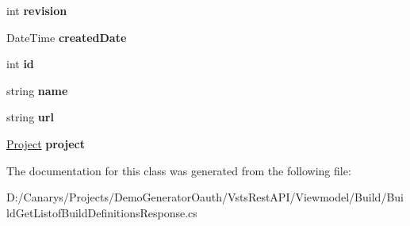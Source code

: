 \begin{DoxyCompactItemize}
\item 
\mbox{\label{class_vsts_rest_a_p_i_1_1_viewmodel_1_1_build_1_1_build_get_listof_build_definitions_response_1_1_value_a2bb81221575164f9c07068a4f5fa725e}} 
int {\bfseries revision}
\item 
\mbox{\label{class_vsts_rest_a_p_i_1_1_viewmodel_1_1_build_1_1_build_get_listof_build_definitions_response_1_1_value_ade5d699e00ff840bc92104bd6272b04a}} 
Date\+Time {\bfseries created\+Date}
\item 
\mbox{\label{class_vsts_rest_a_p_i_1_1_viewmodel_1_1_build_1_1_build_get_listof_build_definitions_response_1_1_value_a3c074fa1d36d7a6c518d6f76ec575355}} 
int {\bfseries id}
\item 
\mbox{\label{class_vsts_rest_a_p_i_1_1_viewmodel_1_1_build_1_1_build_get_listof_build_definitions_response_1_1_value_a62817abe4b71fd36666fe15875e8e064}} 
string {\bfseries name}
\item 
\mbox{\label{class_vsts_rest_a_p_i_1_1_viewmodel_1_1_build_1_1_build_get_listof_build_definitions_response_1_1_value_a112b95a7eae22f6f65cbe99992cfb65c}} 
string {\bfseries url}
\item 
\mbox{\label{class_vsts_rest_a_p_i_1_1_viewmodel_1_1_build_1_1_build_get_listof_build_definitions_response_1_1_value_ab29fc9c7f73e377bf4744ccacc17ca52}} 
\mbox{\hyperlink{class_vsts_rest_a_p_i_1_1_viewmodel_1_1_build_1_1_build_get_listof_build_definitions_response_1_1_project}{Project}} {\bfseries project}
\end{DoxyCompactItemize}


The documentation for this class was generated from the following file\+:\begin{DoxyCompactItemize}
\item 
D\+:/\+Canarys/\+Projects/\+Demo\+Generator\+Oauth/\+Vsts\+Rest\+A\+P\+I/\+Viewmodel/\+Build/Build\+Get\+Listof\+Build\+Definitions\+Response.\+cs\end{DoxyCompactItemize}
